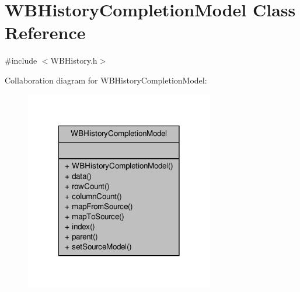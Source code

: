 \hypertarget{class_w_b_history_completion_model}{\section{W\-B\-History\-Completion\-Model Class Reference}
\label{da/d41/class_w_b_history_completion_model}
}


{\ttfamily \#include $<$W\-B\-History.\-h$>$}



Collaboration diagram for W\-B\-History\-Completion\-Model\-:
\nopagebreak
\begin{figure}[H]
\begin{center}
\leavevmode
\includegraphics[width=234pt]{dd/d8f/class_w_b_history_completion_model__coll__graph}
\end{center}
\end{figure}
